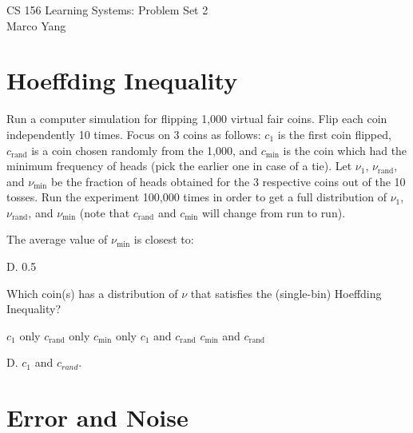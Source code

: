 \documentclass[answers]{exam}
\begin{document}
\begin{center}
{\Large CS 156 Learning Systems: Problem Set 2} \\
\medskip
Marco Yang \\
\bigskip
\end{center}

\section*{Hoeffding Inequality}

Run a computer simulation for flipping 1,000 virtual fair coins. Flip each coin 
independently 10 times. Focus on 3 coins as follows: $c_1$ is the first coin flipped, 
$c_{\text{rand}}$ is a coin chosen randomly from the 1,000, and $c_{\text{min}}$ 
is the coin which had the minimum frequency of heads (pick the earlier one in case 
of a tie). Let $\nu_1$, $\nu_{\text{rand}}$, and $\nu_{\text{min}}$ be the fraction 
of heads obtained for the 3 respective coins out of the 10 tosses.
Run the experiment 100,000 times in order to get a full distribution of $\nu_1$, 
$\nu_{\text{rand}}$, and $\nu_{\text{min}}$ (note that $c_{\text{rand}}$ and 
$c_{\text{min}}$ will change from run to run).

\begin{questions}

\question The average value of $\nu_{\text{min}}$ is closest to:
\begin{choices}
\end{choices}

\begin{solution}
    D. 0.5
\end{solution}

\question Which coin(s) has a distribution of $\nu$ that satisfies the (single-bin) 
Hoeffding Inequality?
\begin{choices}
    \choice $c_1$ only
    \choice $c_{\text{rand}}$ only
    \choice $c_{\text{min}}$ only
    \choice $c_1$ and $c_{\text{rand}}$
    \choice $c_{\text{min}}$ and $c_{\text{rand}}$
\end{choices}

\begin{solution}
    D. $c_1$ and $c_{rand}$.
\end{solution}

\end{questions}

\section*{Error and Noise}
\end{document}
